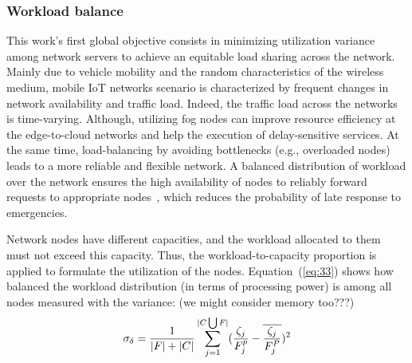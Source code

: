 \documentclass[twocolumn]{article}
\begin{document}
\subsubsection{Workload balance}
\par This work's first global objective consists in minimizing utilization variance among network servers to achieve an equitable load sharing across the network. Mainly due to vehicle mobility and the random characteristics of the wireless medium, mobile IoT networks scenario is characterized by frequent changes in network availability and traffic load. Indeed, the traffic load across the networks is time-varying\cite{bozorgchenani2021computation}. Although, utilizing fog nodes can improve resource efficiency at the edge-to-cloud networks and help the execution of delay-sensitive services. At the same time, load-balancing by avoiding bottlenecks (e.g., overloaded nodes) leads to a more reliable and flexible network. A balanced distribution of workload over the network ensures the high availability of nodes to reliably forward requests to appropriate nodes~\cite{khattak2019utilization}, which reduces the probability of late response to emergencies\cite{khattak2019utilization,rahmani2015smart,gia2019exploiting}. 
\par Network nodes have different capacities, and the workload allocated to them must not exceed this capacity. Thus, the workload-to-capacity proportion is applied to formulate the utilization of the nodes. Equation~(\ref{eq:33}) shows how balanced the workload distribution (in terms of processing power) is among all nodes measured with the variance: (we might consider memory too???)
\begin{equation}
\sigma_{\delta}=\frac{1}{|F|+|C|}
\sum_{j=1}^{|{C}\bigcup{F}|}(\frac{\zeta_{j}}{F_{j}^{p}}-\overline{\frac{\zeta_{j}}{F_{j}^{P}}})^{2}
\label{eq:33}\\
\end{equation}
\end{document}
